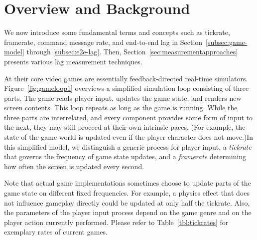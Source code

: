 \section{Overview and Background}
\label{sec:background}

We now introduce some fundamental terms and concepts such as tickrate, framerate, command message rate, and end-to-end lag in Section~\ref{subsec:game-model} through \ref{subsec:e2e-lag}. Then, Section~\ref{sec:measurementapproaches} presents various lag measurement techniques.


At their core video games are essentially feedback-directed real-time simulators. Figure~\ref{fig:gameloop1} overviews a simplified simulation loop consisting of three parts.
The game reads player input, updates the game state, and renders new screen contents. This loop repeats as long as the game is running. While the three parts are interrelated, and every component provides some form of input to the next, they may still proceed at their own intrinsic paces. (For example, the state of the game world is updated even if the player character does not move.)In this simplified model, we distinguish a generic process for player input, a \textit{tickrate} that governs the frequency of game state updates, and a \textit{framerate} determining how often the screen is updated every second.

Note that actual game implementations sometimes choose to update parts of the game state on different fixed frequencies. For example, a physics effect that does not influence gameplay directly could be updated at only half the tickrate. Also, the parameters of the player input process depend on the game genre and on the player action currently performed. Please refer to Table~\ref{tbl:tickrates} for exemplary rates of current games.



